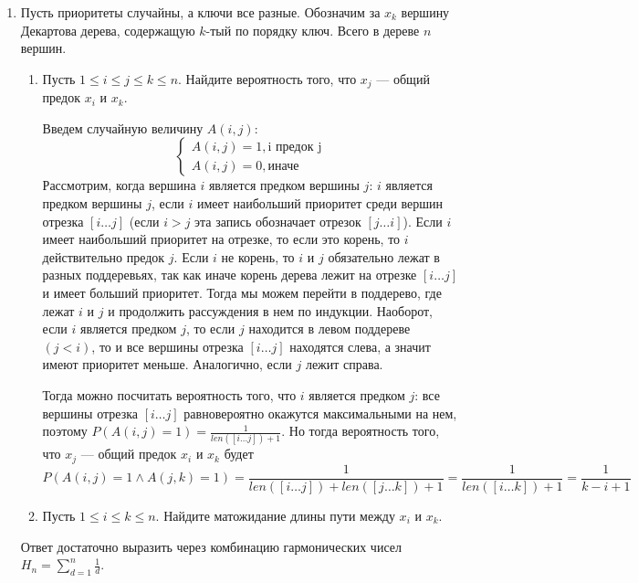 \begin{enumerate}
  \item
    Пусть приоритеты случайны, а ключи все разные. Обозначим за $x_k$ вершину Декартова дерева,
    содержащую $k$-тый по порядку ключ. Всего в дереве $n$ вершин.
    \begin{enumerate}
      \item Пусть $1 \le i \le j \le k \le n$. Найдите вероятность того, что $x_j$ --- общий предок $x_i$ и $x_k$.
      \begin{solution}
        Введем случайную величину $A(i,j)$:
        \begin{equation}
          \begin{cases}
            A(i,j) = 1, \text{i предок j}\\
            A(i,j) = 0, \text{иначе}
          \end{cases}
        \end{equation}
        Рассмотрим, когда вершина $i$ является предком вершины $j$: $i$ является предком вершины $j$, если $i$ имеет наибольший приоритет среди вершин
        отрезка $[i \ldots j]$ (если $i>j$ эта запись обозначает отрезок $[j\ldots i]$). Если $i$ имеет наибольший приоритет на отрезке, то если это корень, то $i$ действительно предок $j$. Если $i$ не корень, то $i$ и $j$ обязательно лежат в разных поддеревьях, так как иначе корень дерева лежит на отрезке $[i\ldots j]$ и имеет больший приоритет. Тогда мы можем перейти в поддерево, где лежат $i$ и $j$ и продолжить рассуждения в нем по индукции. Наоборот, если $i$ является предком $j$, то если $j$ находится в левом поддереве $(j < i)$, то и все вершины отрезка $[i\ldots j]$ находятся слева, а значит имеют приоритет меньше. Аналогично, если $j$ лежит справа. 
        
        Тогда можно посчитать вероятность того, что $i$ является предком $j$: все вершины отрезка $[i \ldots j]$ равновероятно окажутся максимальными на нем, поэтому $P(A(i,j) = 1) = \frac{1}{len([i \ldots j])+1}$. Но тогда вероятность того, что $x_j$ --- общий предок $x_i$ и $x_k$ будет
        \begin{equation}
          P(A(i,j) = 1 \land A(j,k) = 1) = \frac{1}{len([i \ldots j]) + len([j \ldots k]) + 1} = \frac{1}{len([i \ldots k]) + 1} = \frac{1}{k-i+1}
        \end{equation}
      \end{solution}
      \item Пусть $1 \le i \le k \le n$. Найдите матожидание длины пути между $x_i$ и $x_k$.
    \end{enumerate}
    Ответ достаточно выразить через комбинацию гармонических чисел $H_n = \sum\limits_{d = 1}^{n}\frac{1}{d}$.


\end{enumerate}
